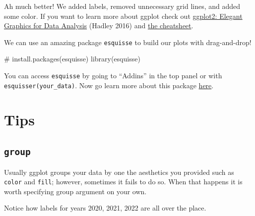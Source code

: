 \documentclass[
  letterpaper,
]{book}
\newenvironment{Shaded}{\begin{snugshade}}{\end{snugshade}}
\newcommand{\CommentTok}[1]{\textcolor[rgb]{0.37,0.37,0.37}{#1}}
\newcommand{\FunctionTok}[1]{\textcolor[rgb]{0.28,0.35,0.67}{#1}}
\newcommand{\NormalTok}[1]{\textcolor[rgb]{0.00,0.23,0.31}{#1}}
\begin{document}
Ah much better! We added labels, removed unnecessary grid lines, and
added some color. If you want to learn more about ggplot check out
\href{https://ggplot2-book.org}{ggplot2: Elegant Graphics for Data
Analysis} (Hadley
2016)
and
\href{https://posit.co/wp-content/uploads/2022/10/data-visualization-1.pdf}{the
cheatsheet}.

We can use an amazing package \texttt{esquisse} to build our plots with
drag-and-drop!

\begin{Shaded}
\begin{Highlighting}[]
\CommentTok{\# install.packages(\textquotesingle{}esquisse\textquotesingle{})}
\FunctionTok{library}\NormalTok{(esquisse)}
\end{Highlighting}
\end{Shaded}

You can access \texttt{esquisse} by going to ``Addins'' in the top panel
or with \texttt{esquisser(your\_data)}. Now go learn more about this
package
\href{https://cran.r-project.org/web/packages/esquisse/vignettes/get-started.html}{here}.

\hypertarget{tips}{%
\section{Tips}\label{tips}}

\hypertarget{group}{%
\subsection{\texorpdfstring{\texttt{group}}{group}}\label{group}}

Usually ggplot groups your data by one the aesthetics you provided such
as \texttt{color} and \texttt{fill}; however, sometimes it fails to do
so. When that happens it is worth specifying group argument on your own.

Notice how labels for years 2020, 2021, 2022 are all over the place.
\end{document}
